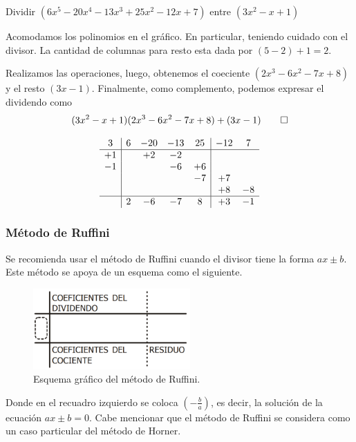 \begin{example}
    Dividir $(6x^5 - 20x^4 - 13x^3 + 25x^2 - 12x + 7)$ entre $(3x^2 - x + 1)$
\end{example}
\begin{multicols}{2}
    \begin{solution}
        Acomodamos los polinomios en el gráfico.
        En particular, teniendo cuidado con el divisor.
        La cantidad de columnas para resto esta dada por $(5 - 2) + 1 = 2$.

        Realizamos las operaciones, luego, obtenemos el coeciente $(2x^3 - 6x^2 - 7x + 8)$ y el resto $(3x - 1)$.
        Finalmente, como complemento, podemos expresar el dividendo como
        \[
            (3x^2 - x + 1)(2x^3 - 6x^2 - 7x + 8) + (3x - 1) \qedhere
        \]
    \end{solution}

    \begin{gather*}
        \begin{array}{c|cccc|cc}
             3 & 6 & -20 & -13 & 25 & -12 &  7 \\\hline
            +1 &   &  +2 &  -2 &    &     &    \\
            -1 &   &     &  -6 & +6 &     &    \\
               &   &     &     & -7 &  +7 &    \\
               &   &     &     &    &  +8 & -8 \\\hline
               & 2 &  -6 &  -7 &  8 &  +3 & -1
        \end{array}
    \end{gather*}
\end{multicols}


\subsubsection{Método de Ruffini}

Se recomienda usar el método de Ruffini cuando el divisor tiene la forma $ax \pm b$.
Este método se apoya de un esquema como el siguiente.
\begin{figure}[H]
    \centering
    \includegraphics[width=6cm]{images/esquema-grafico-ruffini}
    \caption{Esquema gráfico del método de Ruffini.}
    \label{fig:figure2}
\end{figure}
Donde en el recuadro izquierdo se coloca $\left(-\frac{b}{a}\right)$, es decir, la solución de la ecuación $ax \pm b = 0$.
Cabe mencionar que el método de Ruffini se considera como un caso particular del método de Horner.

